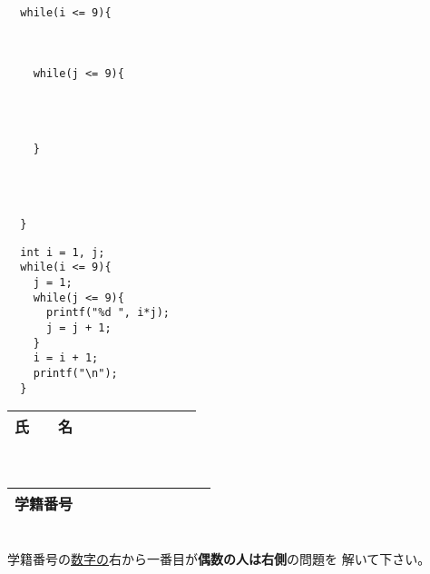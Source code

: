 \documentclass[a4j]{jarticle}
\begin{document}
\begin{multicols*}{2}
\ifnum {}
\begin{verbatim}



  while(i <= 9){



    while(j <= 9){




    }




  }
\end{verbatim}
\vspace{1cm}
\else
\begin{verbatim}
  int i = 1, j;
  while(i <= 9){
    j = 1;
    while(j <= 9){
      printf("%d ", i*j);
      j = j + 1;
    }
    i = i + 1;
    printf("\n");
  }
\end{verbatim}
\vspace{5cm}
\fi




%
%
%
%
%
%
%
%
%







\vfill

\mbox{}





\noindent
\begin{tabular}[t]{|c|cccccccc|}\hline
氏　　名 & & & & & & & & \\ \hline
\end{tabular}\\
\begin{tabular}[t]{|c|c|c|c|c|c|c|c|c|c|}\hline
学籍番号 & & & & & & & & \\ \hline
\end{tabular}\\
学籍番号の\underline{数字の}右から一番目が{\bfseries 偶数の人は右側}の問題を
解いて下さい。
\vspace{-5ex}






\end{multicols*}
\end{document}
